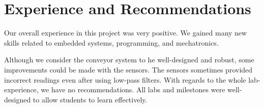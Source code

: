 \section{Experience and Recommendations}\label{sec:intro}
Our overall experience in this project was very positive. We gained many new skills related to embedded systems, programming, and mechatronics. 

Although we consider the conveyor system to he well-designed and robust, some improvements could be made with the sensors. The sensors sometimes provided incorrect readings even after using low-pass filters. With regards to the whole lab-experience, we have no recommendations. All labs and milestones were well-designed to allow students to learn effectively.